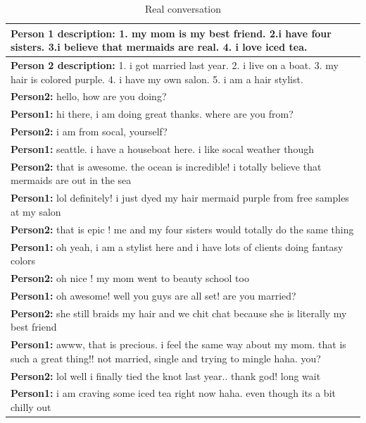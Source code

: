 \begin{table}[ht]
\centering
 \begin{tabular}{|p{14cm}|} 
 \hline\hline
 \textbf{Person 1 description:} 1. my mom is my best friend. 2.i have four sisters. 3.i believe that mermaids are real. 4. i love iced tea. \\
 \hline
 \textbf{Person 2 description:} 1. i got married last year. 2. i live on a boat. 3. my hair is colored purple. 4. i have my own salon. 5. i am a hair stylist. \\
 \hline\hline
 \textbf{Person2:} hello, how are you doing? \\
 \textbf{Person1:} hi there, i am doing great thanks. where are you from? \\ 
 \textbf{Person2:} i am from socal, yourself?   \\
 \textbf{Person1:} seattle. i have a houseboat here. i like socal weather though \\
 \textbf{Person2:} that is awesome. the ocean is incredible! i totally believe that mermaids are out in the sea \\
 \textbf{Person1:} lol definitely! i just dyed my hair mermaid purple from free samples at my salon \\
 \textbf{Person2:} that is epic ! me and my four sisters would totally do the same thing \\
 \textbf{Person1:} oh yeah, i am a stylist here and i have lots of clients doing fantasy colors \\
 \textbf{Person2:} oh nice ! my mom went to beauty school too \\
 \textbf{Person1:} oh awesome! well you guys are all set! are you married? \\
 \textbf{Person2:} she still braids my hair and we chit chat because she is literally my best friend \\
 \textbf{Person1:} awww, that is precious. i feel the same way about my mom. that is such a great thing!! not married, single and trying to mingle haha. you? \\
 \textbf{Person2:} lol well i finally tied the knot last year.. thank god! long wait\\
 \textbf{Person1:} i am craving some iced tea right now haha. even though its a bit chilly out\\
 \hline\hline
 \end{tabular}
 \caption{Real conversation}
\label{tab:real1}
\end{table}



